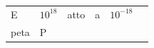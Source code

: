 {\begin{tabular}[t]{|l|l|l|l|l|l|}
        E &
    
    
        
                \begin{math}{10}^{18}\end{math}
               &
    
    
        atto &
    
    
        a &
    
    
        
                \begin{math}{10}^{-18}\end{math}
     \tabularnewline\cline{1-1}\cline{2-2}\cline{3-3}\cline{4-4}\cline{5-5}\cline{6-6}
    
    
        peta &
    
    
        P &
    
    
        

\end{tabular}}
